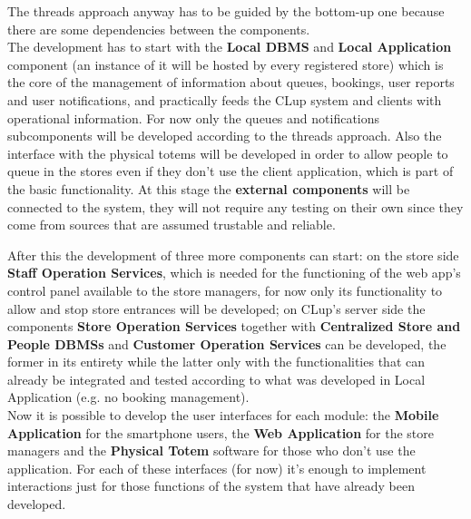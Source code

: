 The threads approach anyway has to be guided by the bottom-up one because there are some dependencies between the components.\\

The development has to start with the \textbf{Local DBMS} and \textbf{Local Application} component (an instance of it will be hosted by every registered store) which is the core of the management of information about queues, bookings, user reports and user notifications, and practically feeds the CLup system and clients with operational information. For now only the queues and notifications subcomponents will be developed according to the threads approach. Also the interface with the physical totems will be developed in order to allow people to queue in the stores even if they don’t use the client application, which is part of the basic functionality. At this stage the \textbf{external components} will be connected to the system, they will not require any testing on their own since they come from sources that are assumed trustable and reliable.

After this the development of three more components can start: on the store side \textbf{Staff Operation Services}, which is needed for the functioning of the web app’s control panel available to the store managers, for now only its functionality to allow and stop store entrances will be developed; on CLup’s server side the components \textbf{Store Operation Services} together with \textbf{Centralized Store and People DBMSs} and \textbf{Customer Operation Services} can be developed, the former in its entirety while the latter only with the functionalities that can already be integrated and tested according to what was developed in Local Application (e.g. no booking management).\\

Now it is possible to develop the user interfaces for each module: the \textbf{Mobile Application} for the smartphone users, the \textbf{Web Application} for the store managers and the \textbf{Physical Totem} software for those who don’t use the application. For each of these interfaces (for now) it’s enough to implement interactions just for those functions of the system that have already been developed.\\

